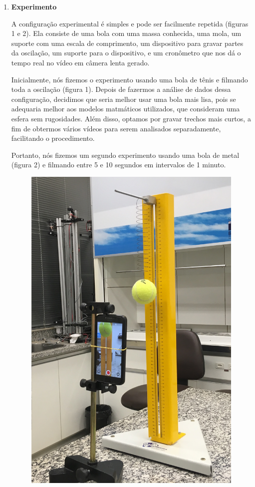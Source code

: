 \documentclass[a4paper, 12pt]{article}
\begin{document}
\begin{multicols}{2}
\begin{enumerate}
		\item \textbf{Experimento}
			\setlength{\parindent}{4ex}
			\par A configuração experimental é simples e pode ser facilmente repetida (figuras 1 e 2). Ela consiste de uma bola com uma massa conhecida, uma mola, um suporte com uma escala de comprimento, um dispositivo para gravar partes da oscilação, um suporte para o dispositivo, e um cronômetro que nos dá o tempo real no vídeo em câmera lenta gerado.
			\par Inicialmente, nós fizemos o experimento usando uma bola de tênis e filmando toda a oscilação (figura 1). Depois de fazermos a análise de dados dessa configuração, decidimos que seria melhor usar uma bola mais lisa, pois se adequaria melhor aos modelos matmáticos utilizados, que consideram uma esfera sem rugosidades. Além disso, optamos por gravar trechos mais curtos, a fim de obtermos vários vídeos para serem analisados separadamente, facilitando o procedimento.
			\par Portanto, nós fizemos um segundo experimento usando uma bola de metal (figura 2) e filmando entre 5 e 10 segundos em intervalos de 1 minuto.
			\begin{figure}[H]
				\centering
				\includegraphics[scale=0.09]{./img/bolaTenis.jpg}

\end{figure}
\end{enumerate}
\end{multicols}
\end{document}
